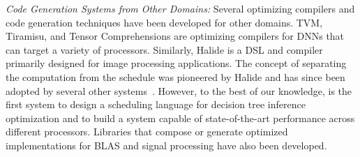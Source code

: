 \emph{Code Generation Systems from Other Domains:}
Several optimizing compilers and code generation techniques have been developed 
for other domains. TVM\cite{TVM}, Tiramisu\cite{Tiramisu}, and Tensor 
Comprehensions\cite{TensorComprehensions} are optimizing compilers 
for DNNs that can target a variety of processors. Similarly, 
Halide\cite{Halide} is a DSL and compiler primarily designed for 
image processing applications. The concept of separating the computation 
from the schedule was pioneered by Halide and has since been adopted 
by several other systems~\cite{TVM,Tiramisu,GraphIt}. However, to 
the best of our knowledge, \Treebeard{} is the first system to design
a scheduling language for decision tree inference optimization
and to build a system capable of state-of-the-art performance 
across different processors.
Libraries that compose or generate optimized implementations  
for BLAS\cite{BLIS, atlas_sc98, CUTLASS} and signal processing\cite{FFTW, SPIRAL}
have also been developed.

